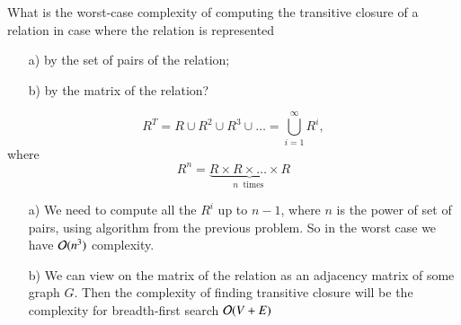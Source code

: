 \documentclass[12pt]{report}
\begin{document}
\begin{problem}{}
    What is the worst-case complexity of computing the transitive closure of a relation in case where the relation is represented
    \begin{itemize}
        \item[a) ] by the set of pairs of the relation;
        \item[b) ] by the matrix of the relation?  
    \end{itemize}
\end{problem}
\begin{solution}
    \begin{definition}{}{}
        \[
            R^T = R \cup R^2 \cup R^3 \cup \ldots = \bigcup\limits_{i=1}^\infty R^i,  
        \]
        where 
        \[
            R^n = \underbrace{R\times R\times \ldots \times R}_{n\ \text{ times }}  
        \]
    \end{definition}
    \begin{itemize}
        \item[a) ] We need to compute all the $R^i$ up to $n - 1$, where $n$ is the power of set of pairs, using algorithm from the previous problem. So in the worst case we have ${\cal O}(n^3)$ complexity.
        \item[b) ] We can view on the matrix of the relation as an adjacency matrix of some graph $G$. Then the complexity of finding transitive closure will be the complexity for breadth-first search ${\cal O}(V+E)$
    \end{itemize}
\end{solution}
\end{document}
